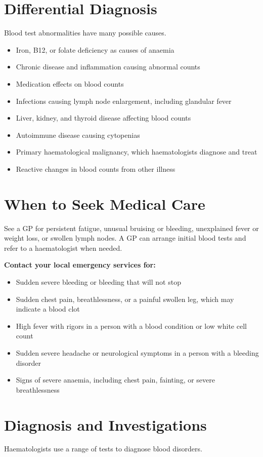 \section*{Differential Diagnosis}
Blood test abnormalities have many possible causes.

\begin{itemize}
    \item Iron, B12, or folate deficiency as causes of anaemia
    \item Chronic disease and inflammation causing abnormal counts
    \item Medication effects on blood counts
    \item Infections causing lymph node enlargement, including glandular fever
    \item Liver, kidney, and thyroid disease affecting blood counts
    \item Autoimmune disease causing cytopenias
    \item Primary haematological malignancy, which haematologists diagnose and treat
    \item Reactive changes in blood counts from other illness
\end{itemize}

\section*{When to Seek Medical Care}
See a GP for persistent fatigue, unusual bruising or bleeding, unexplained fever or weight loss, or swollen lymph nodes. A GP can arrange initial blood tests and refer to a haematologist when needed.

\textbf{Contact your local emergency services for:}
\begin{itemize}
    \item Sudden severe bleeding or bleeding that will not stop
    \item Sudden chest pain, breathlessness, or a painful swollen leg, which may indicate a blood clot
    \item High fever with rigors in a person with a blood condition or low white cell count
    \item Sudden severe headache or neurological symptoms in a person with a bleeding disorder
    \item Signs of severe anaemia, including chest pain, fainting, or severe breathlessness
\end{itemize}

\section*{Diagnosis and Investigations}
Haematologists use a range of tests to diagnose blood disorders.

